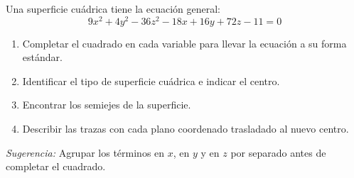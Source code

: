 Una superficie cuádrica tiene la ecuación general:
\[
9x^2 + 4y^2 - 36z^2 - 18x + 16y + 72z - 11 = 0
\]

\begin{enumerate}
    \item Completar el cuadrado en cada variable para llevar la ecuación a su forma estándar.
    \item Identificar el tipo de superficie cuádrica e indicar el centro.
    \item Encontrar los semiejes de la superficie.
    \item Describir las trazas con cada plano coordenado trasladado al nuevo centro.
\end{enumerate}

\textit{Sugerencia:} Agrupar los términos en $x$, en $y$ y en $z$ por separado antes de completar el cuadrado.